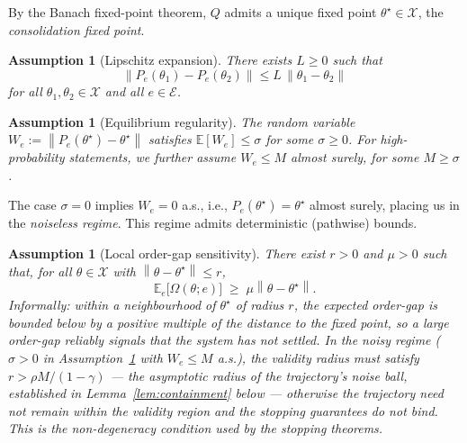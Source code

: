 \documentclass[12pt,a4paper]{article}
\newtheorem{assumption}[definition]{Assumption}
\newcommand{\X}{\mathcal{X}}
\newcommand{\E}{\mathcal{E}}
\newcommand{\norm}[1]{\left\lVert#1\right\rVert}
\newcommand{\Ogap}{\Omega}
\begin{document}
By the Banach fixed-point theorem, $Q$ admits a unique fixed point
$\theta^\star \in \X$, the \emph{consolidation fixed point}.

\begin{assumption}[Lipschitz expansion]
\label{ass:lipschitz}
There exists $L \geq 0$ such that
\[
  \norm{P_e(\theta_1) - P_e(\theta_2)} \leq L\,\norm{\theta_1 - \theta_2}
\]
for all $\theta_1, \theta_2 \in \X$ and all $e \in \E$.
\end{assumption}

\begin{assumption}[Equilibrium regularity]
\label{ass:equilibrium}
The random variable $W_e := \norm{P_e(\theta^\star) - \theta^\star}$
satisfies $\mathbb{E}[W_e] \leq \sigma$ for some $\sigma \geq 0$. For
high-probability statements, we further assume $W_e \leq M$ almost surely,
for some $M \geq \sigma$.
\end{assumption}

The case $\sigma = 0$ implies $W_e = 0$ a.s., i.e.,
$P_e(\theta^\star) = \theta^\star$ almost surely, placing us in the
\emph{noiseless regime}. This regime admits deterministic
(pathwise) bounds.

\begin{assumption}[Local order-gap sensitivity]
\label{ass:nondeg}
There exist $r > 0$ and $\mu > 0$ such that, for all $\theta \in \X$ with
$\norm{\theta - \theta^\star} \leq r$,
\[
  \mathbb{E}_e\bigl[\Ogap(\theta; e)\bigr] \;\geq\; \mu \norm{\theta - \theta^\star}.
\]
Informally: within a neighbourhood of $\theta^\star$ of radius $r$, the
expected order-gap is bounded below by a positive multiple of the distance to
the fixed point, so a large order-gap reliably signals that the system has not
settled. In the noisy regime ($\sigma > 0$ in
Assumption~\ref{ass:equilibrium} with $W_e \leq M$ a.s.), the validity radius
must satisfy $r > \rho M/(1-\gamma)$ — the asymptotic radius of the
trajectory's noise ball, established in Lemma~\ref{lem:containment} below —
otherwise the trajectory need not remain within the validity region and the
stopping guarantees do not bind. This is the non-degeneracy condition used
by the stopping theorems.
\end{assumption}
\end{document}
